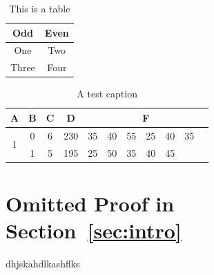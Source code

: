 \documentclass[11pt]{article}
\theoremstyle{plain}
\theoremstyle{definition}
\begin{document}
	\begin{table}[ht]
		\centering
		\caption{This is a table}
		\label{tbl:1}
		\begin{tabular}{|c|c|}
			\hline
			\textbf{Odd} & \textbf{Even} \\
			\hline\hline
			One & Two \\
			\hline
			Three & Four \\
			\hline
		\end{tabular}

	\end{table}
	
\begin{table}[htbp]
\centering
\begin{tabular}{|c|c|c|c|p{1cm}p{1cm}p{1cm}p{1cm}p{1cm}p{1cm}p{1cm}|}
\hline
A & B & C & D & \multicolumn{7}{|c|}{F}  \\ \hline
\multirow{ 2}{*}{1} & 0 & 6 & 230 & 35 & 40 & 55 & 25 & 40 & 35 & \\
& 1 & 5 & 195 & 25 & 50 & 35 & 40 & 45 &  &  \\ \hline
\end{tabular}
\caption{A test caption}
\label{table2}
\end{table}

	
	
	
	
    
	
	
\appendix
	
\section{Omitted Proof in Section~\ref{sec:intro}}
	\label{app:1}
	dhjskahdlkashflks
	
\end{document}
